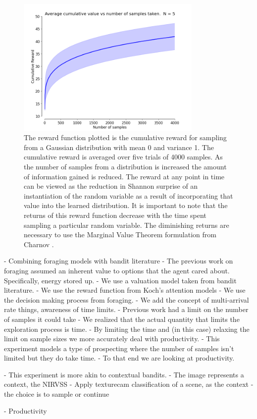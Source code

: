 \begin{figure}[htpd!]
	\centering
	\includegraphics[width=0.8\textwidth]{images/cumulative-reward.png}
	\caption{The reward function plotted is the cumulative reward for sampling from a Gaussian distribution with mean 0 and variance 1.  The cumulative reward is averaged over five trials of 4000 samples.  As the number of samples from a distribution is increased the amount of information gained is reduced.  The reward at any point in time can be viewed as the reduction in Shannon surprise of an instantiation of the random variable as a result of incorporating that value into the learned distribution.  It is important to note that the returns of this reward function decrease with the time spent sampling a particular random variable.  The diminishing returns are necessary to use the Marginal Value Theorem formulation from Charnov \cite{charnov1973optimal}.}
	\label{fig:reward}
\end{figure}

	- Combining foraging models with bandit literature 
		- The previous work on foraging assumed an inherent value to
			options that the agent cared about.  Specifically, energy stored up.
		- We use a valuation model taken from bandit literature.  
		- We use the reward function from Koch's attention models
		- We use the decision making process from foraging. 
		- We add the concept of multi-arrival rate things, awareness of time limits.
	- Previous work had a limit on the number of samples it could take
		- We realized that the actual quantity that limits the exploration process
			is time.
		- By limiting the time and (in this case) relaxing the limit on sample sizes we more accurately deal with productivity.  
	- This experiment models a type of prospecting where the number of samples isn't limited but they do take time. 
	- To that end we are looking at productivity.

	-  This experiment is more akin to contextual bandits.  
	- The image represents a context, the NIRVSS 
	- Apply texturecam classification of a scene, as the context
	- the choice is to sample or continue

	- Productivity 


